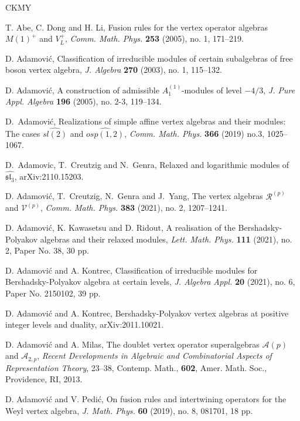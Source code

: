 \documentclass[11pt, reqno]{amsart}
\theoremstyle{definition}\newtheorem{defi}[thm]{Definition}
\theoremstyle{definition}\newtheorem{rem}[thm]{Remark}
\theoremstyle{definition}\newtheorem{exam}[thm]{Example}
\theoremstyle{definition}\newtheorem{assum}[thm]{Assumption}
\newcommand{\cA}{\mathcal{A}}
\begin{document}
\begin{thebibliography}{CKMY}

T. Abe, C. Dong and H. Li, Fusion rules for the vertex operator algebras $M(1)^+$ and $V_L^+$, \textit{Comm. Math. Phys.} \textbf{253} (2005), no. 1, 171--219.

D. Adamovi\'{c}, Classification of irreducible modules of certain subalgebras of free boson vertex algebra, \textit{J. Algebra} \textbf{270} (2003), no. 1, 115--132.

D. Adamovi\'{c}, A construction of admissible $A_1^{(1)}$-modules of level $-4/3$, \textit{J. Pure Appl. Algebra} \textbf{196} (2005), no. 2-3, 119--134.

D.~Adamovi\'c,
Realizations of simple affine vertex algebras and their modules: The cases ${\widehat{sl(2)}}$ and ${\widehat{osp(1,2)}}$,
\textit{Comm. Math. Phys.} \textbf{366} (2019) no.3, 1025--1067.

D.~Adamovic, T.~Creutzig and N.~Genra,
Relaxed and logarithmic modules of $\widehat{\mathfrak{sl}_3}$, arXiv:2110.15203.

D. Adamovi\'{c}, T.~Creutzig, N.~Genra and J.~Yang,
The vertex algebras $\mathcal R^{(p)}$ and $\mathcal V^{(p)}$, \textit{Comm. Math. Phys.} \textbf{383} (2021), no. 2, 1207--1241.

D. Adamovi\'{c}, K. Kawasetsu and D. Ridout, A realisation of the Bershadsky-Polyakov algebras and their relaxed modules, \textit{Lett. Math. Phys.} \textbf{111} (2021), no. 2, Paper No. 38, 30 pp.

D. Adamovi\'{c} and A. Kontrec, Classification of irreducible modules for Bershadsky-Polyakov algebra at certain levels, \textit{J. Algebra Appl.} \textbf{20} (2021), no. 6, Paper No. 2150102, 39 pp.

D. Adamovi\'{c} and A. Kontrec, Bershadsky-Polyakov vertex algebras at positive integer levels and duality, arXiv:2011.10021.

D. Adamovi\'{c} and A. Milas, The doublet vertex operator superalgebras $\cA(p)$ and $\cA_{2,p}$, \textit{Recent Developments in Algebraic and Combinatorial Aspects of Representation Theory}, 23--38, Contemp. Math., \textbf{602}, Amer. Math. Soc., Providence, RI, 2013.

D. Adamovi\'{c} and V. Pedi\'{c}, On fusion rules and intertwining operators for the Weyl vertex algebra, \textit{J. Math. Phys.} \textbf{60} (2019), no. 8, 081701, 18 pp.


\end{thebibliography}
\end{document}
